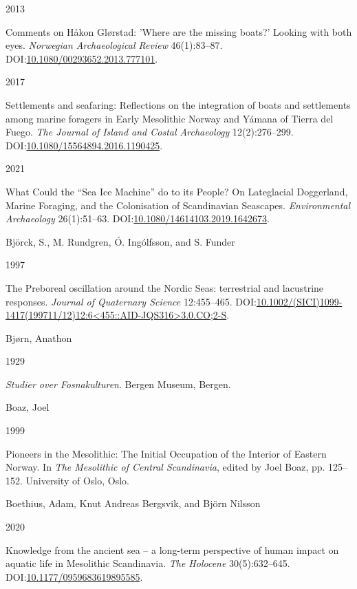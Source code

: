 \documentclass[
  a4paper,
  oneside]{uiophdthesis}
\newlength{\cslhangindent}
\newlength{\csllabelwidth}
\newlength{\cslentryspacingunit} %
\newenvironment{CSLReferences}[2] %
 {%
  \setlength{\parindent}{0pt}
  \ifodd #1
  \let\oldpar\par
  \def\par{\hangindent=\cslhangindent\oldpar}
  \fi
  \setlength{\parskip}{#2\cslentryspacingunit}
 }%
 {}
\newcommand{\CSLBlock}[1]{#1\hfill\break}
\newcommand{\CSLLeftMargin}[1]{\parbox[t]{\csllabelwidth}{#1}}
\newcommand{\CSLRightInline}[1]{\parbox[t]{\linewidth - \csllabelwidth}{#1}\break}
\begin{document}
\begin{CSLReferences}{0}{0}
\leavevmode{}%
\CSLLeftMargin{ 2013 }
\CSLRightInline{{Comments on Håkon Glørstad: 'Where are the missing boats?' Looking with both eyes}. \emph{Norwegian Archaeological Review} 46(1):83--87. DOI:\href{https://doi.org/10.1080/00293652.2013.777101}{10.1080/00293652.2013.777101}.}

\leavevmode{}%
\CSLLeftMargin{ 2017 }
\CSLRightInline{{Settlements and seafaring: Reflections on the integration of boats and settlements among marine foragers in Early Mesolithic Norway and Yámana of Tierra del Fuego}. \emph{The Journal of Island and Costal Archaeology} 12(2):276--299. DOI:\href{https://doi.org/10.1080/15564894.2016.1190425}{10.1080/15564894.2016.1190425}.}

\leavevmode{}%
\CSLLeftMargin{ 2021 }
\CSLRightInline{{What Could the {``Sea Ice Machine''} do to its People? On Lateglacial Doggerland, Marine Foraging, and the Colonisation of Scandinavian Seascapes}. \emph{Environmental Archaeology} 26(1):51--63. DOI:\href{https://doi.org/10.1080/14614103.2019.1642673}{10.1080/14614103.2019.1642673}.}

\leavevmode{}%
\CSLBlock{Björck, S., M. Rundgren, Ó. Ingólfsson, and S. Funder}
\CSLLeftMargin{ 1997}
\CSLRightInline{{The Preboreal oscillation around the Nordic Seas: terrestrial and lacustrine responses}. \emph{Journal of Quaternary Science} 12:455--465. DOI:\href{https://doi.org/10.1002/(SICI)1099-1417(199711/12)12:6\%3C455::AID-JQS316\%3E3.0.CO;2-S}{10.1002/(SICI)1099-1417(199711/12)12:6\textless455::AID-JQS316\textgreater3.0.CO;2-S}.}

\leavevmode{}%
\CSLBlock{Bjørn, Anathon}
\CSLLeftMargin{ 1929}
\CSLRightInline{\emph{{Studier over Fosnakulturen}}. Bergen Museum, Bergen.}

\leavevmode{}%
\CSLBlock{Boaz, Joel}
\CSLLeftMargin{ 1999}
\CSLRightInline{{Pioneers in the Mesolithic: The Initial Occupation of the Interior of Eastern Norway}. In \emph{{The Mesolithic of Central Scandinavia}}, edited by Joel Boaz, pp. 125--152. University of Oslo, Oslo.}

\leavevmode{}%
\CSLBlock{Boethius, Adam, Knut Andreas Bergsvik, and Björn Nilsson}
\CSLLeftMargin{ 2020}
\CSLRightInline{{Knowledge from the ancient sea -- a long-term perspective of human impact on aquatic life in Mesolithic Scandinavia}. \emph{The Holocene} 30(5):632--645. DOI:\href{https://doi.org/10.1177/0959683619895585}{10.1177/0959683619895585}.}


\end{CSLReferences}
\end{document}
